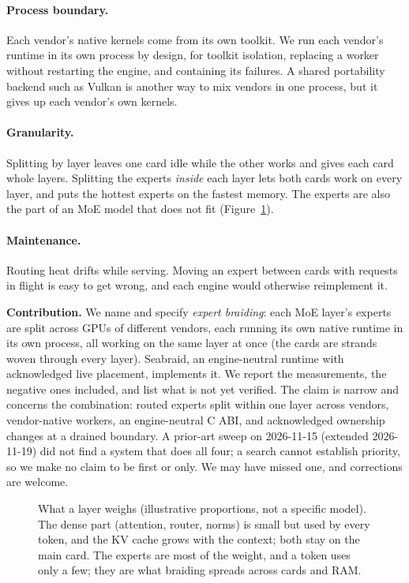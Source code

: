 \documentclass[11pt]{article}
\newcommand{\product}{Seabraid}                 %
\begin{document}
\paragraph{Process boundary.} Each vendor's native kernels come from its own toolkit. We run each vendor's runtime in
its own process by design, for toolkit isolation, replacing a worker without restarting the engine, and containing its
failures. A shared portability backend such as Vulkan is another way to mix vendors in one process, but it gives up each
vendor's own kernels.

\paragraph{Granularity.} Splitting by layer leaves one card idle while the other works and gives each card whole
layers. Splitting the experts \emph{inside} each layer lets both cards work on every layer, and puts the hottest
experts on the fastest memory. The experts are also the part of an MoE model that does not fit (Figure~\ref{fig:weight}).

\paragraph{Maintenance.} Routing heat drifts while serving. Moving an expert between cards with requests in flight
is easy to get wrong, and each engine would otherwise reimplement it.

\textbf{Contribution.} We name and specify \emph{expert braiding}: each MoE layer's experts are split across GPUs of different vendors, each running its own native runtime in its own process, all working on the same layer at once (the cards are strands woven through every layer). \product, an engine-neutral runtime with acknowledged live placement, implements it. We report the measurements, the negative ones included, and list what is not yet verified. The claim is narrow and concerns the combination: routed experts split within one layer across vendors,
vendor-native workers, an engine-neutral C ABI, and acknowledged ownership changes at a drained boundary. A prior-art
sweep on 2026-11-15 (extended 2026-11-19) did not find a system that does all four; a search cannot establish priority, so
we make no claim to be first or only. We may have missed one, and corrections are welcome.

\begin{figure}[t]
\centering

\caption{What a layer weighs (illustrative proportions, not a specific model). The dense part (attention, router,
norms) is small but used by every token, and the KV cache grows with the context; both stay on the main card. The
experts are most of the weight, and a token uses only a few; they are what braiding spreads across cards and RAM.}
\label{fig:weight}
\end{figure}
\end{document}
